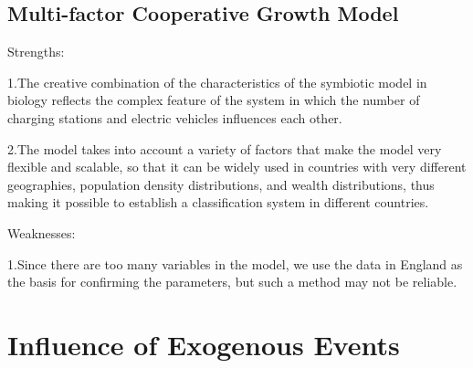 \documentclass{mcmthesis}
\begin{document}
	
	\subsection{Multi-factor Cooperative Growth Model}
	Strengths:
	\par
	1.The creative combination of the characteristics of the symbiotic model in biology reflects the complex feature of the system in which the number of charging stations and electric vehicles influences each other.
	\par
	2.The model takes into account a variety of factors that make the model very flexible and scalable, so that it can be widely used in countries with very different geographies, population density distributions, and wealth distributions, thus making it possible to establish a classification system in different countries.
	\par
	Weaknesses:
	\par
	1.Since there are too many variables in the model, we use the data in England as the basis for confirming the parameters, but such a method may not be reliable.
\section{Influence of Exogenous Events}
\end{document}
